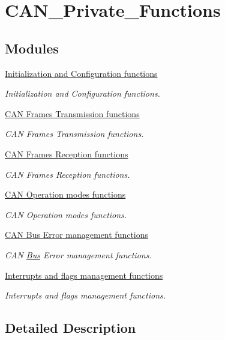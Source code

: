 \hypertarget{group___c_a_n___private___functions}{}\section{C\+A\+N\+\_\+\+Private\+\_\+\+Functions}
\label{group___c_a_n___private___functions}
\subsection*{Modules}
\begin{DoxyCompactItemize}
\item 
\hyperlink{group___c_a_n___group1}{Initialization and Configuration functions}
\begin{DoxyCompactList}\small\item\em Initialization and Configuration functions. \end{DoxyCompactList}\item 
\hyperlink{group___c_a_n___group2}{C\+A\+N Frames Transmission functions}
\begin{DoxyCompactList}\small\item\em C\+A\+N Frames Transmission functions. \end{DoxyCompactList}\item 
\hyperlink{group___c_a_n___group3}{C\+A\+N Frames Reception functions}
\begin{DoxyCompactList}\small\item\em C\+A\+N Frames Reception functions. \end{DoxyCompactList}\item 
\hyperlink{group___c_a_n___group4}{C\+A\+N Operation modes functions}
\begin{DoxyCompactList}\small\item\em C\+A\+N Operation modes functions. \end{DoxyCompactList}\item 
\hyperlink{group___c_a_n___group5}{C\+A\+N Bus Error management functions}
\begin{DoxyCompactList}\small\item\em C\+A\+N \hyperlink{class_bus}{Bus} Error management functions. \end{DoxyCompactList}\item 
\hyperlink{group___c_a_n___group6}{Interrupts and flags management functions}
\begin{DoxyCompactList}\small\item\em Interrupts and flags management functions. \end{DoxyCompactList}\end{DoxyCompactItemize}


\subsection{Detailed Description}
